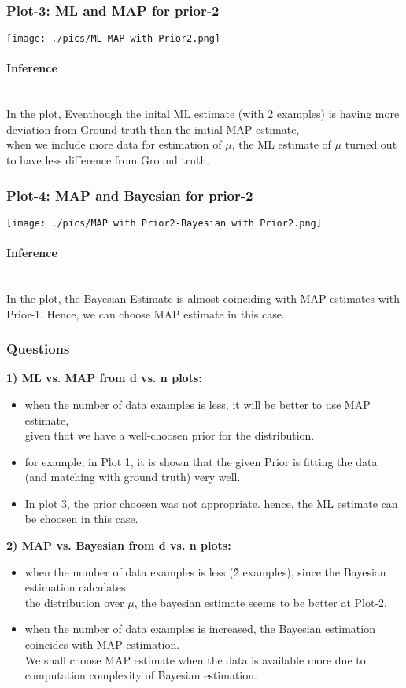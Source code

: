 \documentclass[fleqn]{article}
\newcommand{\myparagraph}[1]{\paragraph{#1}\mbox{}\\}
\begin{document}
\subsubsection{Plot-3: ML and MAP for prior-2}
\texttt{[image: ./pics/ML-MAP with Prior2.png]} \newline
\myparagraph{Inference}
In the plot, Eventhough the inital ML estimate (with 2 examples) is having more deviation from Ground truth than the initial MAP estimate,\\
when we include more data for estimation of $\mu$, the ML estimate of $\mu$ turned out to have less difference from Ground truth. \\
\subsubsection{Plot-4: MAP and Bayesian for prior-2}
\texttt{[image: ./pics/MAP with Prior2-Bayesian with Prior2.png]} \newline
\myparagraph{Inference}
In the plot, the Bayesian Estimate is almost coinciding with MAP estimates with Prior-1. Hence, we can choose MAP estimate in this case.\\

\subsubsection{Questions}
\textbf{1) ML vs. MAP from d vs. n plots:}\\
\begin{itemize}
  \item when the number of data examples is less, it will be better to use MAP estimate,\\
   given that we have a well-choosen prior for the distribution.
   \item for example, in Plot 1, it is shown that the given Prior is fitting the data (and matching with ground truth) very well.
   \item In plot 3, the prior choosen was not appropriate. hence, the ML estimate can be choosen in this case.
\end{itemize}
\textbf{2) MAP vs. Bayesian from d vs. n plots:}\\
\begin{itemize}
  \item when the number of data examples is less (\~2 examples), since the Bayesian estimation calculates \\
  the distribution over $\mu$, the bayesian estimate seems to be better at Plot-2. 
  \item when the number of data examples is increased, the Bayesian estimation coincides with MAP estimation. \\ 
  We shall choose MAP estimate when the data is available more due to computation complexity of Bayesian estimation.
\end{itemize}
\end{document}

